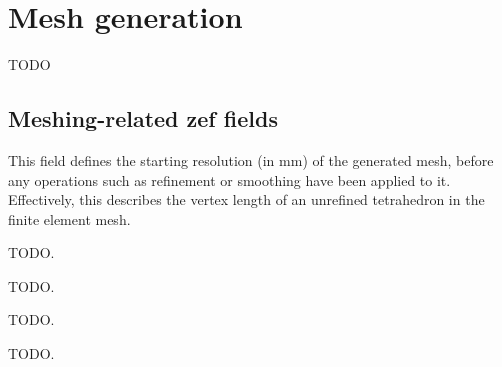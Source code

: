 \section{Mesh generation}\label{sec:mesh-generation}

TODO


\subsection{Meshing-related zef fields}\label{ssec:meshing-fields}

 This field defines the starting resolution
(in \si{\milli\meter}) of the generated mesh, before any operations such as
refinement or smoothing have been applied to it. Effectively, this describes
the vertex length of an unrefined tetrahedron in the finite element mesh.

 TODO.

 TODO.

 TODO.

 TODO.
